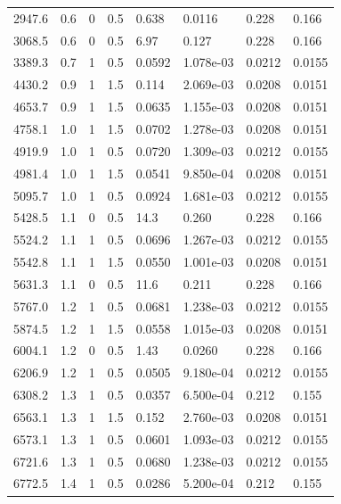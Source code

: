 \documentclass[preview]{standalone}
\begin{document}
{{\begin{tabular}{L{1.2cm}C{1.2cm} C{0.3cm}C{0.5cm} C{1.4cm}C{1.4cm} C{1.4cm}C{1.4cm}}
  2947.6  &   0.6  & 0     & 0.5 &  0.638  & 0.0116  & 0.228 &  0.166   \\ 
  3068.5  &   0.6  & 0     & 0.5 &  6.97  & 0.127  & 0.228 &  0.166   \\ 
  3389.3  &   0.7  & 1     & 0.5 &  0.0592  & 1.078e-03  & 0.0212 &  0.0155   \\ 
  4430.2  &   0.9  & 1     & 1.5 &  0.114  & 2.069e-03  & 0.0208 &  0.0151   \\ 
  4653.7  &   0.9  & 1     & 1.5 &  0.0635  & 1.155e-03  & 0.0208 &  0.0151   \\ 
  4758.1  &   1.0  & 1     & 1.5 &  0.0702  & 1.278e-03  & 0.0208 &  0.0151   \\ 
  4919.9  &   1.0  & 1     & 0.5 &  0.0720  & 1.309e-03  & 0.0212 &  0.0155   \\ 
  4981.4  &   1.0  & 1     & 1.5 &  0.0541  & 9.850e-04  & 0.0208 &  0.0151   \\ 
  5095.7  &   1.0  & 1     & 0.5 &  0.0924  & 1.681e-03  & 0.0212 &  0.0155   \\ 
  5428.5  &   1.1  & 0     & 0.5 &  14.3  & 0.260  & 0.228 &  0.166   \\ 
  5524.2  &   1.1  & 1     & 0.5 &  0.0696  & 1.267e-03  & 0.0212 &  0.0155   \\ 
  5542.8  &   1.1  & 1     & 1.5 &  0.0550  & 1.001e-03  & 0.0208 &  0.0151   \\ 
  5631.3  &   1.1  & 0     & 0.5 &  11.6  & 0.211  & 0.228 &  0.166   \\ 
  5767.0  &   1.2  & 1     & 0.5 &  0.0681  & 1.238e-03  & 0.0212 &  0.0155   \\ 
  5874.5  &   1.2  & 1     & 1.5 &  0.0558  & 1.015e-03  & 0.0208 &  0.0151   \\ 
  6004.1  &   1.2  & 0     & 0.5 &  1.43  & 0.0260  & 0.228 &  0.166   \\ 
  6206.9  &   1.2  & 1     & 0.5 &  0.0505  & 9.180e-04  & 0.0212 &  0.0155   \\ 
  6308.2  &   1.3  & 1     & 0.5 &  0.0357  & 6.500e-04  & 0.212 &  0.155   \\ 
  6563.1  &   1.3  & 1     & 1.5 &  0.152  & 2.760e-03  & 0.0208 &  0.0151   \\ 
  6573.1  &   1.3  & 1     & 0.5 &  0.0601  & 1.093e-03  & 0.0212 &  0.0155   \\ 
  6721.6  &   1.3  & 1     & 0.5 &  0.0680  & 1.238e-03  & 0.0212 &  0.0155   \\ 
  6772.5  &   1.4  & 1     & 0.5 &  0.0286  & 5.200e-04  & 0.212 &  0.155   \\ 

\end{tabular}}}
\end{document}
